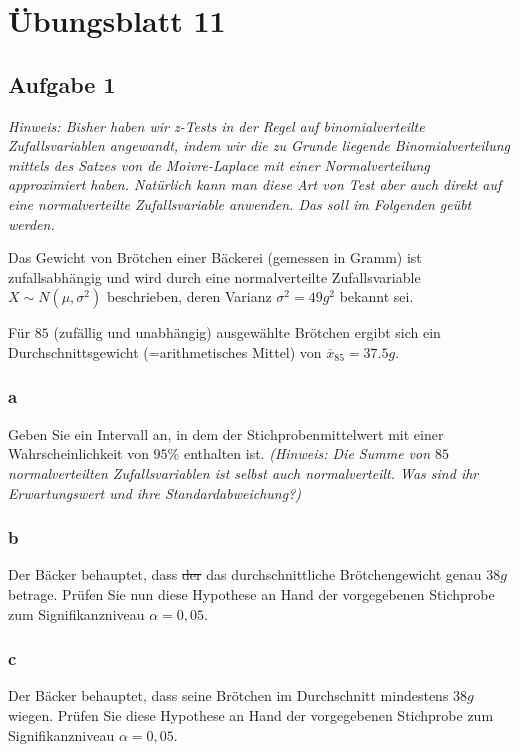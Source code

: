 \chapter{Übungsblatt 11}

\section{Aufgabe 1}

\textit{Hinweis: Bisher haben wir z-Tests in der Regel auf binomialverteilte Zufallsvariablen
    angewandt, indem wir die zu Grunde liegende Binomialverteilung mittels des Satzes von de
    Moivre-Laplace mit einer Normalverteilung approximiert haben. Natürlich kann man diese Art
    von Test aber auch direkt auf eine normalverteilte Zufallsvariable anwenden. Das soll im
    Folgenden geübt werden.}

Das Gewicht von Brötchen einer Bäckerei (gemessen in Gramm) ist zufallsabhängig und wird durch eine normalverteilte Zufallsvariable $X \sim N(\mu, \sigma^2)$ beschrieben, deren Varianz $\sigma^2 = 49g^2$ bekannt sei.

Für $85$ (zufällig und unabhängig) ausgewählte Brötchen ergibt sich ein Durchschnittsgewicht (=arithmetisches Mittel) von  $\overline{x}_85 = 37.5g$.

\subsection{a}
Geben Sie ein Intervall an, in dem der Stichprobenmittelwert mit einer Wahrscheinlichkeit von $95\%$ enthalten ist. \textit{(Hinweis: Die Summe von $85$ normalverteilten Zufallsvariablen ist selbst auch normalverteilt. Was sind ihr Erwartungswert und ihre Standardabweichung?)}

\subsection{b}

Der Bäcker behauptet, dass \sout{der} das durchschnittliche Brötchengewicht genau $38g$ betrage. Prüfen Sie nun diese Hypothese an Hand der vorgegebenen Stichprobe zum Signifikanzniveau $\alpha = 0,05$.

\subsection{c}

Der Bäcker behauptet, dass seine Brötchen im Durchschnitt mindestens $38g$ wiegen. Prüfen Sie diese Hypothese an Hand der vorgegebenen Stichprobe zum Signifikanzniveau $\alpha = 0,05$.